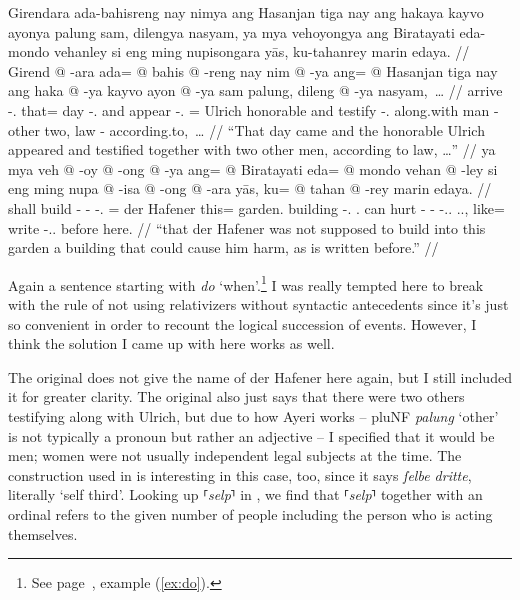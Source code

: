 \documentclass[12pt,paper=a4]{scrartcl}
\newcommand{\fw}[1]{\textit{#1}} %
\newcommand{\norm}[1]{⸢\textit{#1}⸣} %
\newcommand{\xayr}[3]{{\Tagati #1} \emph{#2} \enquote*{#3}}
\begin{document}
\pex
	\glpreamble Girendara ada-bahisreng nay nimya ang Hasanjan tiga nay ang 
		hakaya kayvo ayonya palung sam, dilengya nasyam, ya mya 
		vehoyongya ang Biratayati eda-mondo vehanley si eng ming 
		nupisongara yās, ku-tahanrey marin edaya. //
	\a \begingl
		\gla Girend @ -ara ada= @ bahis @ -reng nay nim @ -ya ang= @ 
			Hasanjan tiga nay ang haka @ -ya kayvo ayon @ -ya sam 
			palung, dileng @ -ya nasyam,~… //
		\glb arrive -\Tsg{}.\Inan{} that= day -\Aarg{}.\Inan{} and 
			appear -\Tsg{}.\M{} \Aarg{}= Ulrich honorable and 
			\AgtT{} testify -\Tsg{}.\M{} along.with man -\Loc{} 
			other two, law -\Loc{} according.to,~… //
		\glft \enquote{That day came and the honorable Ulrich appeared 
			and testified together with two other men, according to 
			law, …} //
	\endgl
	\a \begingl
		\gla ya mya veh @ -oy @ -ong @ -ya ang= @ Biratayati eda= @ mondo 
			vehan @ -ley si eng ming nupa @ -isa @ -ong @ -ara yās, 
			ku= @ tahan @ -rey marin edaya. //
		\glb \LocT{} shall build -\Neg{} -\Irr{} -\Tsg{}.\M{} \Aarg{}= 
			{der Hafener} this= garden.\Top{} building 
			-\Parg{}.\Inan{} \Rel{} \AgtT{}.\Inan{} can hurt 
			-\Caus{} -\Irr{} -\Tsg{}.\Inan{}.\Top{} 
			\Tsg{}.\M{}.\Parg{}, like= write -\Tsg{}.\Inan{}.\Parg{} 
			before here. //
		\glft \enquote{that {der Hafener} was not supposed to build into 
			this garden a building that could cause him harm, as is 
			written before.} //
	\endgl
\xe

Again a sentence starting with \fw{do} `when'.\footnote{See page~\pageref{ex:do},
example (\ref{ex:do}).} I was really tempted here to break with the rule of not 
using relativizers without syntactic antecedents since it's just so convenient 
in order to recount the logical succession of events. However, I think the 
solution I came up with here works as well.

The \Mhg{} original does not give the name of der Hafener here again, but I 
still included it for greater clarity. The original also just says that there 
were two others testifying along with Ulrich, but due to how Ayeri works -- 
\xayr{pluNF}{palung}{other} is not typically a pronoun but rather an adjective
-- I specified that it would be men; women were not usually independent legal 
subjects at the time. The construction used in \Mhg{} is interesting in this 
case, too, since it says \fw{ſelbe dritte}, literally `self third'. Looking up 
\norm{selp} in \textcite{lexer}, we find that \norm{selp} together with an 
ordinal refers to the given number of people including the person who is acting 
themselves.
\end{document}
